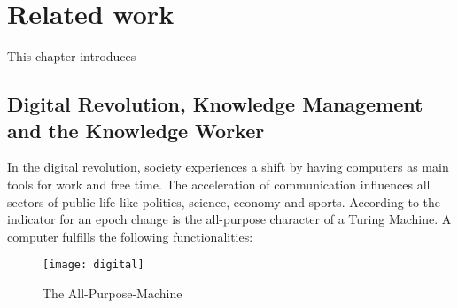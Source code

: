
\chapter{Related work}
\label{relatedwork}
This chapter introduces

\section{Digital Revolution, Knowledge Management and the Knowledge Worker}
\label{knowledgemanagement}
In the digital revolution, society experiences a shift by having computers as main tools for work and free time. The acceleration of communication influences all sectors of public life like politics, science, economy and sports. According to \cite{buhl1997virtuelle} the indicator for an epoch change is the all-purpose character of a Turing Machine. A computer fulfills the following functionalities:

\begin{figure}[ht]
	\centering
  \texttt{[image: digital]}
	\caption{The All-Purpose-Machine}
	\label{fig1}
\end{figure}


